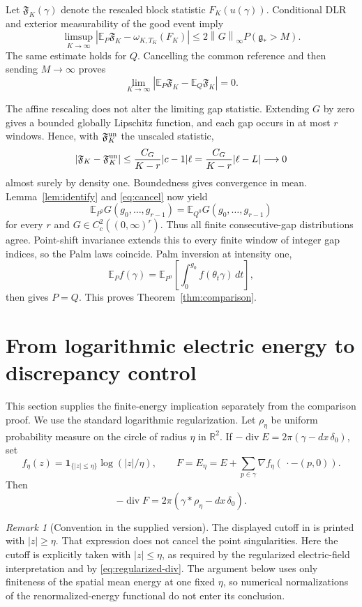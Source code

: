 \documentclass[11pt,reqno]{amsart}
\numberwithin{equation}{section}
\theoremstyle{definition}
\theoremstyle{remark}
\newtheorem{remark}[theorem]{Remark}
\newcommand{\R}{\mathbb R}
\newcommand{\E}{\mathbb E}
\newcommand{\1}{\mathbf 1}
\newcommand{\dd}{\,d}
\newcommand{\gap}{\mathfrak g}
\newcommand{\norm}[1]{\left\lVert #1\right\rVert}
\newcommand{\abs}[1]{\left\lvert #1\right\rvert}
\DeclareMathOperator{\diver}{div}
\begin{document}
Let $\mathfrak F_K(\gamma)$ denote the rescaled block statistic
$F_K(u(\gamma))$. Conditional DLR and exterior measurability of the
good event imply
\[
\limsup_{K\to\infty}
\abs{\E_P\mathfrak F_K-\omega_{K,T_K}(F_K)}
\le 2\norm G_\infty P(\gap_*>M).
\]
The same estimate holds for $Q$. Cancelling the common reference and
then sending $M\to\infty$ proves
\begin{equation}\label{eq:cancel}
\lim_{K\to\infty}
\abs{\E_P\mathfrak F_K-\E_Q\mathfrak F_K}=0.
\end{equation}

The affine rescaling does not alter the limiting gap statistic.
Extending $G$ by zero gives a bounded globally Lipschitz function, and
each gap occurs in at most $r$ windows. Hence, with
$\mathfrak F_K^{\rm un}$ the unscaled statistic,
\[
|\mathfrak F_K-\mathfrak F_K^{\rm un}|
\le \frac{C_G}{K-r}|c-1|\ell
=\frac{C_G}{K-r}|\ell-L|\longrightarrow0
\]
almost surely by density one. Boundedness gives convergence in mean.
Lemma~\ref{lem:identify} and \eqref{eq:cancel} now yield
\[
\E_{P^0}G(g_0,\ldots,g_{r-1})
=\E_{Q^0}G(g_0,\ldots,g_{r-1})
\]
for every $r$ and $G\in C_c^2((0,\infty)^r)$.
Thus all finite consecutive-gap distributions agree. Point-shift
invariance extends this to every finite window of integer gap indices,
so the Palm laws coincide. Palm inversion at intensity one,
\[
\E_P f(\gamma)=
\E_{P^0}\left[\int_0^{g_0}f(\theta_t\gamma)\dd t\right],
\]
then gives $P=Q$. This proves Theorem~\ref{thm:comparison}.

\section{From logarithmic electric energy to discrepancy control}
\label{sec:energy}

This section supplies the finite-energy implication separately from
the comparison proof. We use the standard logarithmic regularization.
Let $\rho_\eta$ be uniform probability measure on the circle of radius
$\eta$ in $\R^2$. If
$-\diver E=2\pi(\gamma-dx\,\delta_0)$, set
\[
f_\eta(z)=\1_{\{|z|\le\eta\}}\log(|z|/\eta),\qquad
F=E_\eta=E+\sum_{p\in\gamma}\nabla f_\eta(\,\cdot-(p,0)).
\]
Then
\begin{equation}\label{eq:regularized-div}
-\diver F=2\pi(\gamma*\rho_\eta-dx\,\delta_0).
\end{equation}

\begin{remark}[Convention in the supplied version]\label{rem:cutoff}
The displayed cutoff in \cite[Definition~2.20]{DHLM} is printed with
$|z|\ge\eta$. That expression does not cancel the point singularities.
Here the cutoff is explicitly taken with $|z|\le\eta$, as required by
the regularized electric-field interpretation and by
\eqref{eq:regularized-div}. The argument below uses only finiteness of
the spatial mean energy at one fixed $\eta$, so numerical normalizations
of the renormalized-energy functional do not enter its conclusion.
\end{remark}
\end{document}
